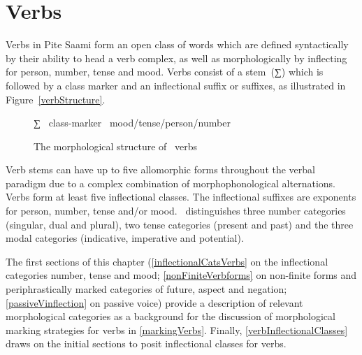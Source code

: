 

\chapter{Verbs}\label{verbs}
Verbs in Pite Saami form an open class of words which are defined syntactically by their ability to head a verb complex, as well as morphologically by inflecting for person, number, tense and mood. 
Verbs consist of a \mbox{stem (∑)} which is followed by a class marker and an inflectional suffix or suffixes, %
as illustrated in Figure~\vref{verbStructure}. %

\begin{figure}[h]\centering
∑ \PLUS\ class-marker \PLUS\ mood/tense/person/number%
\caption{The morphological structure of \PS\ verbs}\label{verbStructure}
\end{figure}

Verb stems can have up to five allomorphic forms throughout the verbal para\-digm due to a complex combination of morphophonological alternations. 
Verbs form at least five inflectional classes. 
The inflectional suffixes are exponents for person, number, tense and/or mood. 
\PS\ distinguishes three number categories (singular, dual and plural), two tense categories (present and past) and the three modal categories (indicative, imperative and potential). 


The first sections of this chapter (\SEC\ref{inflectionalCatsVerbs} on the inflectional categories number, tense and mood; \SEC\ref{nonFiniteVerbforms} on non-finite forms and periphrastically marked categories of future, aspect and negation; \SEC\ref{passiveVinflection} on passive voice) provide a description of relevant morphological categories as a background for the discussion of morphological marking strategies for verbs in \SEC\ref{markingVerbs}. Finally, \SEC\ref{verbInflectionalClasses} draws on the initial sections to posit inflectional classes for verbs. 


